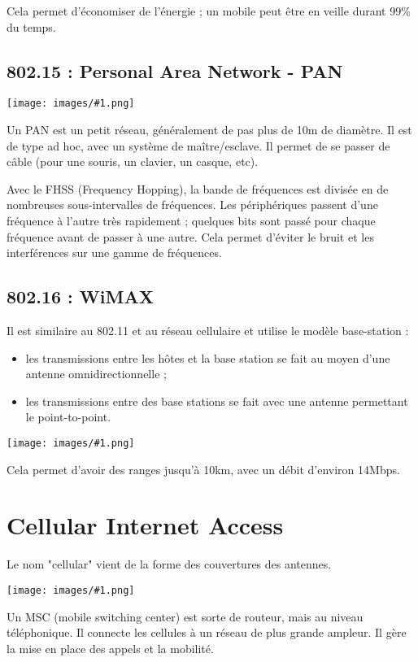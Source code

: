 \documentclass[10pt,a4paper]{report}
\newcommand{\dessin}[1]{\begin{center}\texttt{[image: images/\#1.png]}\end{center}}
\begin{document}
			Cela permet d'économiser de l'énergie ; un mobile peut être en veille durant 99\% du temps.
		
		
		\subsection{802.15 : Personal Area Network - PAN}
		
		\dessin{43}
		
		Un PAN est un petit réseau, généralement de pas plus de 10m de diamètre. Il est de type ad hoc, avec un système de maître/esclave. Il permet de se passer de câble (pour une souris, un clavier, un casque, etc).
		
		Avec le FHSS (Frequency Hopping), la bande de fréquences est divisée en de nombreuses sous-intervalles de fréquences. Les périphériques passent d'une fréquence à l'autre très rapidement ; quelques bits sont passé pour chaque fréquence avant de passer à une autre. Cela permet d'éviter le bruit et les interférences sur une gamme de fréquences.
		
		\subsection{802.16 : WiMAX}
		
		Il est similaire au 802.11 et au réseau cellulaire et utilise le modèle base-station :
		
		\begin{itemize}
			\item les transmissions entre les hôtes et la base station se fait au moyen d'une antenne omnidirectionnelle ;
			\item les transmissions entre des base stations se fait avec une antenne permettant le point-to-point.
		\end{itemize}
		
		\dessin{44}
		
		Cela permet d'avoir des ranges jusqu'à 10km, avec un débit d'environ 14Mbps.
			
	\section{Cellular Internet Access}
	
	Le nom "cellular" vient de la forme des couvertures des antennes.
	
	\dessin{45}
	
	Un MSC (mobile switching center) est sorte de routeur, mais au niveau téléphonique. Il connecte les cellules à un réseau de plus grande ampleur. Il gère la mise en place des appels et la mobilité.
	
\end{document}
